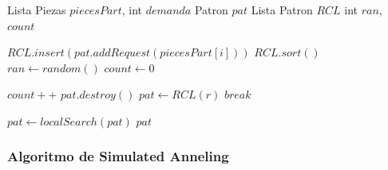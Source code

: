 \documentclass[letterpaper,11pt]{article}
\begin{document}
\begin{center}
\begin{algorithmic}

\REQUIRE Lista Piezas $piecesPart$, int $demanda$
\STATE  Patron $pat$
\STATE  Lista Patron $RCL$
\STATE  int $ran$, $count$
  
    	\STATE $RCL.insert(pat.addRequest(piecesPart[i]))$
    \ENDWHILE
    \STATE $RCL.sort()$
    \STATE $ran \gets random()$
    \STATE $count \gets 0$

    	\STATE $count++$
        	\STATE $pat.destroy()$
        	\STATE $pat \gets RCL(r)$
        	\STATE $break$
      	\ENDIF
    \ENDWHILE
   
    \STATE $pat \gets localSearch(pat)$
\ENDWHILE
\RETURN $pat$

\end{algorithmic}
\end{center}

\subsubsection{Algoritmo de Simulated Anneling}
\end{document}
